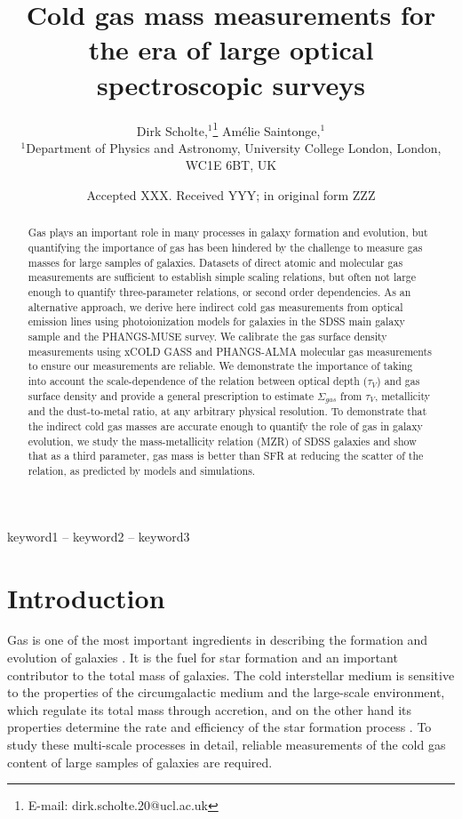 \documentclass[fleqn,usenatbib]{mnras}
\title[Cold gas masses for spectroscopic surveys]{Cold gas mass measurements for the era of large optical spectroscopic surveys}
\author[D. Scholte et al.]{
Dirk Scholte,$^{1}$\thanks{E-mail: dirk.scholte.20@ucl.ac.uk}
Am\'elie Saintonge,$^{1}$
\\
$^{1}$Department of Physics and Astronomy, University College London, London, WC1E 6BT, UK
}
\date{Accepted XXX. Received YYY; in original form ZZZ}
\begin{document}
\label{firstpage}
\pagerange{\pageref{firstpage}--\pageref{lastpage}}
\maketitle

\begin{abstract}
Gas plays an important role in many processes in galaxy formation and evolution, but quantifying the importance of gas has been hindered by the challenge to measure gas masses for large samples of galaxies. Datasets of direct atomic and molecular gas measurements are sufficient to establish simple scaling relations, but often not large enough to quantify three-parameter relations, or second order dependencies.  As an alternative approach, we derive here indirect cold gas measurements from optical emission lines using photoionization models for galaxies in the SDSS main galaxy sample and the PHANGS-MUSE survey. We calibrate the gas surface density measurements using xCOLD GASS and PHANGS-ALMA molecular gas measurements to ensure our measurements are reliable. We demonstrate the importance of taking into account the scale-dependence of the relation between optical depth ($\tau_V$) and gas surface density and provide a general prescription to estimate $\Sigma_{gas}$ from $\tau_V$, metallicity and the dust-to-metal ratio, at any arbitrary physical resolution. To demonstrate that the indirect cold gas masses are accurate enough to quantify the role of gas in galaxy evolution, we study the mass-metallicity relation (MZR) of SDSS galaxies and show that as a third parameter, gas mass is better than SFR at reducing the scatter of the relation, as predicted by models and simulations. 
\end{abstract}

\begin{keywords}
keyword1 -- keyword2 -- keyword3
\end{keywords}



\section{Introduction}
Gas is one of the most important ingredients in describing the formation and evolution of galaxies \citep{tinsley1980}. It is the fuel for star formation and an important contributor to the total mass of galaxies. The cold interstellar medium is sensitive to the properties of the circumgalactic medium and the large-scale environment, which regulate its total mass through accretion, and on the other hand its properties determine the rate and efficiency of the star formation process \citep[e.g.][]{saintonge22}. To study these multi-scale processes in detail, reliable measurements of the cold gas content of large samples of galaxies are required.
\end{document}
